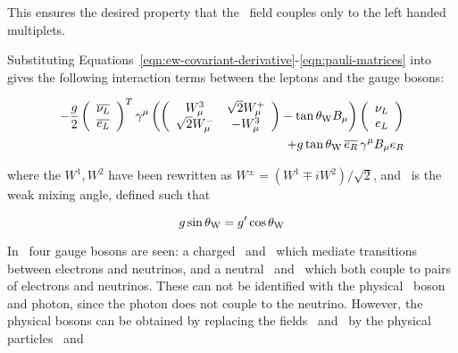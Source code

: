 This ensures the desired property that the \sutwo\ field
couples only to the left handed multiplets. 


Substituting Equations~\ref{eqn:ew-covariant-derivative}-\ref{eqn:pauli-matrices}
 into~ gives the following
interaction terms between the leptons and the gauge bosons:

\begin{equation}
\begin{split}
- \frac{g}{2}
\left( \begin{array}{c}\overline{\nu_{L}} \\  \overline{e_{L}} \end{array} \right)^{T}
\gamma^{\mu} \left(
\left( \begin{array}{cc} W^{3}_{\mu} & \sqrt{2} W^{+}_{\mu} \\ \sqrt{2} W^{-}_{\mu} & -
W^{3}_{\mu} \end{array} \right)
- \tan{\ensuremath{\theta_{\mathrm{W}}}} B_{\mu} \right)
\left( \begin{array}{c} \nu_{L} \\  e_{L} \end{array} \right) \\
+ g \tan{\ensuremath{\theta_{\mathrm{W}}}} \, \overline{e_{R}} \, \gamma^{\mu} B_{\mu} e_{R}
\end{split}
\label{eqn:ew-lepton-interactions}
\end{equation}

where the $W^{1}, W^{2}$ have been rewritten as $W^{\pm} = (W^{1} \mp
iW^{2})/\sqrt{2}$, and \thetaW\ is the weak mixing angle, defined such that

\begin{equation}
g \sin{\ensuremath{\theta_{\mathrm{W}}}} = g' \cos{\ensuremath{\theta_{\mathrm{W}}}}
\end{equation}

In~ four gauge bosons are seen: a charged \Wp\ and
\Wm\ which mediate transitions between electrons and neutrinos, and a neutral
\Wthreemu\ and \Bmu\ which both couple to pairs of electrons and neutrinos.
These can not be identified with the physical \Z\ boson and photon, since the
photon does not couple to the neutrino.  However, the physical bosons can be obtained by replacing the fields \Wthreemu\ and \Bmu\ by the
physical particles \Zmu\ and \Amu

